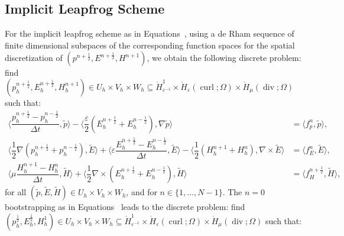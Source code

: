 \documentclass{amsart}
\theoremstyle{thmstyleone}%
\theoremstyle{thmstyletwo}%
\theoremstyle{thmstylethree}%
\DeclareMathOperator{\curl}{curl}
\def\divgn{\operatorname{div}}
\newcommand{\aInnerproduct}[2]{\bigl\langle #1, #2 \bigr\rangle}
\begin{document}
\subsection{Implicit Leapfrog Scheme}%

For the implicit leapfrog scheme as in Equations~, using a de Rham sequence of finite dimensional subspaces of the corresponding function spaces for the spatial discretization of $(p^{n + \frac{1}{2}}, E^{n + \frac{1}{2}}, H^{n + 1})$, we obtain the following discrete problem: find $(p_h^{n + \frac{1}{2}}, E_h^{n + \frac{1}{2}}, H_h^{n + 1}) \in U_h \times V_h \times W_h \subseteq \mathring{H}_{\varepsilon^{-1}}^1 \times \mathring{H}_{\varepsilon}(\curl; \Omega) \times \mathring{H}_{\mu}(\divgn; \Omega)$ such that:
\begin{subequations}
\begin{align}
  \aInnerproduct{\dfrac{p_h^{n + \frac{1}{2}} - p_h^{n - \frac{1}{2}}}{\Delta t}}{\widetilde{p}} - \aInnerproduct{\dfrac{\varepsilon}{2} \left( E_h^{n + \frac{1}{2}} + E_h^{n - \frac{1}{2}} \right)}{\nabla \widetilde{p}} &= \aInnerproduct{ f_p^{n}}{\widetilde{p}}, \label{eqn:maxwell_p_lf_full} \\
  \aInnerproduct{\dfrac{1}{2}\nabla \left(p_h^{n + \frac{1}{2}} + p_h^{n - \frac{1}{2}} \right)}{\widetilde{E}} + \aInnerproduct{\varepsilon \dfrac{E_h^{n + \frac{1}{2}} - E_h^{n - \frac{1}{2}}}{\Delta t}}{\widetilde{E}} - \aInnerproduct{\dfrac{1}{2} \left( H_h^{n + 1} + H_h^n \right)}{\nabla \times \widetilde{E}} &= \aInnerproduct{f_E^n}{\widetilde{E}}, \label{eqn:maxwell_E_lf_full} \\
  \aInnerproduct{\mu \dfrac{H_h^{n + 1} - H_h^n}{\Delta t}}{\widetilde{H}} +  \aInnerproduct{\dfrac{1}{2}  \nabla \times  \left( E_h^{n + \frac{1}{2}} +E_h^{n - \frac{1}{2}} \right)}{\widetilde{H}} &= \aInnerproduct{f_H^{n + \frac{1}{2}}}{\widetilde{H}}, \label{eqn:maxwell_H_lf_full}
\end{align}
\end{subequations}
for all $(\widetilde{p}, \widetilde{E}, \widetilde{H}) \in U_h \times V_h \times W_h$, and for $n \in \{1, \dotso, N - 1\}$. 
The $n = 0$ bootstrapping as in Equations~ leads to the discrete problem: find $(p_h^{\frac{1}{2}}, E_h^{\frac{1}{2}}, H_h^1) \in U_h \times V_h \times W_h \subseteq \mathring{H}_{\varepsilon^{-1}}^1 \times \mathring{H}_{\varepsilon}(\curl; \Omega) \times \mathring{H}_{\mu}(\divgn; \Omega)$ such that:
\end{document}
